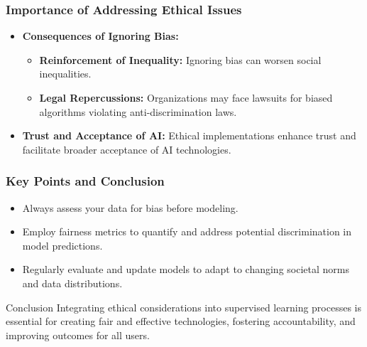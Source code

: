 \documentclass{beamer}
\begin{document}
\begin{frame}[fragile]
    \frametitle{Importance of Addressing Ethical Issues}
    \begin{itemize}
        \item \textbf{Consequences of Ignoring Bias:}
        \begin{itemize}
            \item \textbf{Reinforcement of Inequality:} Ignoring bias can worsen social inequalities.
            \item \textbf{Legal Repercussions:} Organizations may face lawsuits for biased algorithms violating anti-discrimination laws.
        \end{itemize}
        \item \textbf{Trust and Acceptance of AI:} Ethical implementations enhance trust and facilitate broader acceptance of AI technologies.
    \end{itemize}
\end{frame}

\begin{frame}[fragile]
    \frametitle{Key Points and Conclusion}
    \begin{itemize}
        \item Always assess your data for bias before modeling.
        \item Employ fairness metrics to quantify and address potential discrimination in model predictions.
        \item Regularly evaluate and update models to adapt to changing societal norms and data distributions.
    \end{itemize}
    \begin{block}{Conclusion}
        Integrating ethical considerations into supervised learning processes is essential for creating fair and effective technologies, fostering accountability, and improving outcomes for all users.
    \end{block}
\end{frame}
\end{document}

